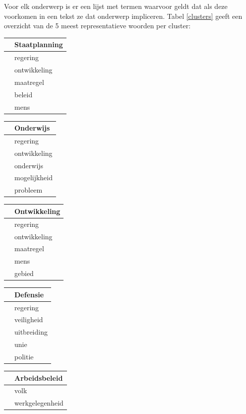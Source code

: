 Voor elk onderwerp is er een lijst met termen waarvoor geldt dat als deze voorkomen in een tekst ze dat onderwerp impliceren. Tabel \ref{clusters} geeft een overzicht van de 5 meest representatieve woorden per cluster:
\begin{table}[H]
\centering
\begin{tabular}{ll}
\toprule
{} &             Staatplanning \\
\midrule
 &      regering \\
 &  ontwikkeling \\
 &     maatregel \\
 &        beleid \\
 &          mens \\
\bottomrule
\end{tabular}
\begin{tabular}{ll}
\toprule
{} &             Onderwijs \\
\midrule
 &  regering \\
 &     ontwikkeling \\
 &       onderwijs \\
 &  mogelijkheid \\
 &      probleem \\
\bottomrule
\end{tabular}
\begin{tabular}{ll}
\toprule
{} &             Ontwikkeling \\
\midrule
 &      regering \\
 &  ontwikkeling \\
 &     maatregel \\
 &          mens \\
 &        gebied \\
\bottomrule
\end{tabular}
\begin{tabular}{ll}
\toprule
{} &            Defensie \\
\midrule
 &     regering \\
 &   veiligheid \\
 &  uitbreiding \\
 &         unie \\
 &      politie \\
\bottomrule
\end{tabular}
\begin{tabular}{ll}
\toprule
{} &                Arbeidsbeleid \\
\midrule
 &             volk \\
 &  werkgelegenheid \\

\end{tabular}
\end{table}
